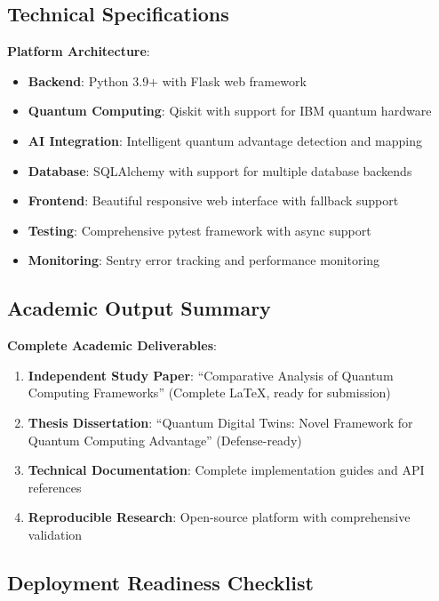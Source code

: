 \documentclass[12pt,a4paper]{article}
\begin{document}
\subsection{Technical Specifications}

\textbf{Platform Architecture}:
\begin{itemize}
    \item \textbf{Backend}: Python 3.9+ with Flask web framework
    \item \textbf{Quantum Computing}: Qiskit with support for IBM quantum hardware
    \item \textbf{AI Integration}: Intelligent quantum advantage detection and mapping
    \item \textbf{Database}: SQLAlchemy with support for multiple database backends
    \item \textbf{Frontend}: Beautiful responsive web interface with fallback support
    \item \textbf{Testing}: Comprehensive pytest framework with async support
    \item \textbf{Monitoring}: Sentry error tracking and performance monitoring
\end{itemize}

\subsection{Academic Output Summary}

\textbf{Complete Academic Deliverables}:
\begin{enumerate}
    \item \textbf{Independent Study Paper}: ``Comparative Analysis of Quantum Computing Frameworks'' (Complete LaTeX, ready for submission)
    \item \textbf{Thesis Dissertation}: ``Quantum Digital Twins: Novel Framework for Quantum Computing Advantage'' (Defense-ready)
    \item \textbf{Technical Documentation}: Complete implementation guides and API references
    \item \textbf{Reproducible Research}: Open-source platform with comprehensive validation
\end{enumerate}

\subsection{Deployment Readiness Checklist}
\end{document}
